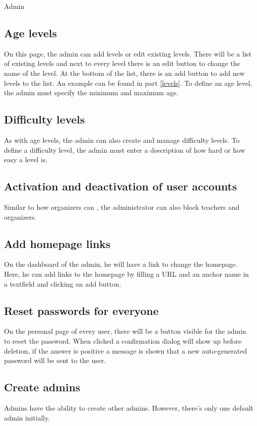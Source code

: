 \begin{section}{Admin}
\subsection{Age levels}
On this page, the admin can add levels or edit existing levels. There will be a list of existing levels and next to every level there is an edit button to change the name of the level. At the bottom of the list, there is an add button to add new levels to the list. An example can be found in part \ref{levels}. To define an age level, the admin must specify the minimum and maximum age. 

\subsection{Difficulty levels}
As with age levels, the admin can also create and manage difficulty levels. To define a difficulty level, the admin must enter a description of how hard or how easy a level is.

\subsection{Activation and deactivation of user accounts}
Similar to how organizers can , the administrator can also block teachers and organizers.

\subsection{Add homepage links}
On the dashboard of the admin, he will have a link to change the homepage. Here, he can add links to the homepage by filling a URL and an anchor name in a textfield and clicking an add button. 

\subsection{Reset passwords for everyone}
On the personal page of every user, there will be a button visible for the admin to reset the password. When clicked a confirmation dialog will show up before deletion, if the answer is positive a message is shown that a new auto-generated password will be sent to the user.

\subsection{Create admins}
Admins have the ability to create other admins. However, there's only one default admin initially. 

\end{section}
